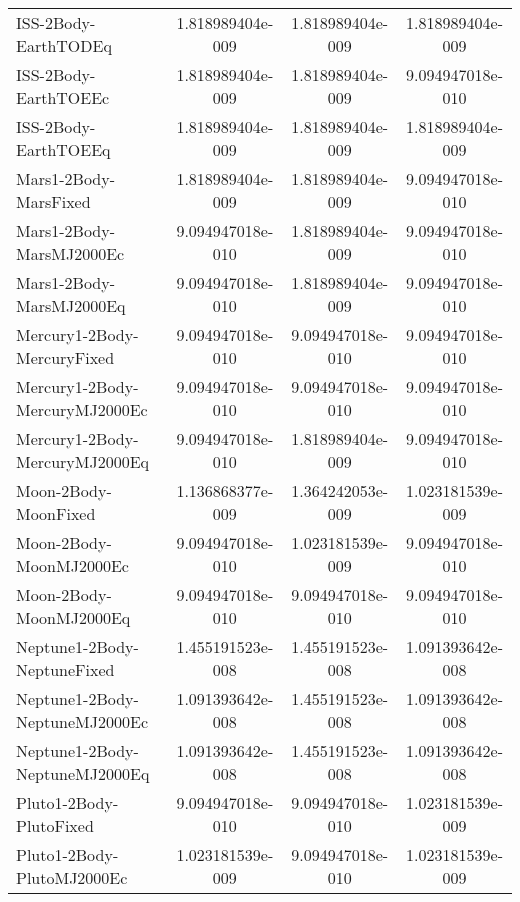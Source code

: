\begin{table}[htbp!]
\begin{tabular}{lccc}
         ISS-2Body-EarthTODEq & 1.818989404e-009 & 1.818989404e-009 & 1.818989404e-009 \\
         ISS-2Body-EarthTOEEc & 1.818989404e-009 & 1.818989404e-009 & 9.094947018e-010 \\
         ISS-2Body-EarthTOEEq & 1.818989404e-009 & 1.818989404e-009 & 1.818989404e-009 \\
         Mars1-2Body-MarsFixed & 1.818989404e-009 & 1.818989404e-009 & 9.094947018e-010 \\
         Mars1-2Body-MarsMJ2000Ec & 9.094947018e-010 & 1.818989404e-009 & 9.094947018e-010 \\
         Mars1-2Body-MarsMJ2000Eq & 9.094947018e-010 & 1.818989404e-009 & 9.094947018e-010 \\
         Mercury1-2Body-MercuryFixed & 9.094947018e-010 & 9.094947018e-010 & 9.094947018e-010 \\
         Mercury1-2Body-MercuryMJ2000Ec & 9.094947018e-010 & 9.094947018e-010 & 9.094947018e-010 \\
         Mercury1-2Body-MercuryMJ2000Eq & 9.094947018e-010 & 1.818989404e-009 & 9.094947018e-010 \\
         Moon-2Body-MoonFixed & 1.136868377e-009 & 1.364242053e-009 & 1.023181539e-009 \\
         Moon-2Body-MoonMJ2000Ec & 9.094947018e-010 & 1.023181539e-009 & 9.094947018e-010 \\
         Moon-2Body-MoonMJ2000Eq & 9.094947018e-010 & 9.094947018e-010 & 9.094947018e-010 \\
         Neptune1-2Body-NeptuneFixed & 1.455191523e-008 & 1.455191523e-008 & 1.091393642e-008 \\
         Neptune1-2Body-NeptuneMJ2000Ec & 1.091393642e-008 & 1.455191523e-008 & 1.091393642e-008 \\
         Neptune1-2Body-NeptuneMJ2000Eq & 1.091393642e-008 & 1.455191523e-008 & 1.091393642e-008 \\
         Pluto1-2Body-PlutoFixed & 9.094947018e-010 & 9.094947018e-010 & 1.023181539e-009 \\
         Pluto1-2Body-PlutoMJ2000Ec & 1.023181539e-009 & 9.094947018e-010 & 1.023181539e-009 \\

\end{tabular}
\end{table}
